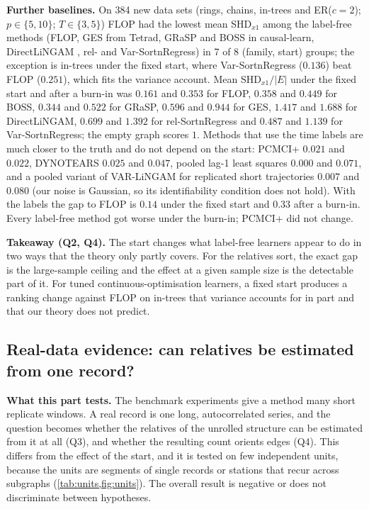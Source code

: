 \documentclass[pdflatex,sn-apa]{sn-jnl}
\theoremstyle{thmstyleone}
\theoremstyle{thmstylethree}
\theoremstyle{thmstyletwo}
\begin{document}
\textbf{Further baselines.} On 384 new data sets (rings, chains, in-trees and
ER($c{=}2$); $p\in\{5,10\}$; $T\in\{3,5\}$) FLOP had the lowest mean SHD$_{x1}$
among the label-free methods (FLOP, GES from Tetrad, GRaSP \citep{lam2022grasp} and BOSS
\citep{andrews2023boss} in causal-learn, DirectLiNGAM \citep{shimizu2011directlingam}, rel- and Var-SortnRegress) in 7 of 8 (family,
start) groups; the exception is in-trees under the fixed start, where
Var-SortnRegress ($0.136$) beat FLOP ($0.251$), which fits the variance
account. Mean SHD$_{x1}/|E|$ under the fixed start and after a burn-in was
$0.161$ and $0.353$ for FLOP, $0.358$ and $0.449$ for BOSS, $0.344$ and $0.522$
for GRaSP, $0.596$ and $0.944$ for GES, $1.417$ and $1.688$ for DirectLiNGAM,
$0.699$ and $1.392$ for rel-SortnRegress and $0.487$ and $1.139$ for
Var-SortnRegress; the empty graph scores $1$. Methods that use the time labels
are much closer to the truth and do not depend on the start: PCMCI+
\citep{runge2020pcmciplus} $0.021$ and $0.022$, DYNOTEARS \citep{pamfil2020dynotears}
$0.025$ and $0.047$, pooled lag-1 least squares $0.000$ and $0.071$, and a pooled
variant of VAR-LiNGAM \citep{hyvarinen2010varlingam} for replicated short
trajectories $0.007$ and $0.080$ (our noise is Gaussian, so its identifiability
condition does not hold). With the labels the gap to FLOP is $0.14$ under the
fixed start and $0.33$ after a burn-in. Every label-free method got worse under
the burn-in; PCMCI+ did not change.

\textbf{Takeaway (Q2, Q4).} The start changes what label-free learners appear
to do in two ways that the theory only partly covers. For the relatives sort,
the exact gap is the large-sample ceiling and the effect at a given sample size
is the detectable part of it. For tuned continuous-optimisation learners, a
fixed start produces a ranking change against FLOP on in-trees that variance
accounts for in part and that our theory does not predict.

\subsection{Real-data evidence: can relatives be estimated from one record?}
\label{sec:real}

\textbf{What this part tests.} The benchmark experiments give a method many
short replicate windows. A real record is one long, autocorrelated series, and
the question becomes whether the relatives of the unrolled structure can be
estimated from it at all (Q3), and whether the resulting count orients edges
(Q4). This differs from the effect of the start, and it is tested on few
independent units, because the units are segments of single records or
stations that recur across subgraphs (\cref{tab:units,fig:units}). The overall result is
negative or does not discriminate between hypotheses.
\end{document}
